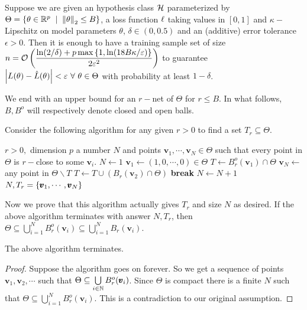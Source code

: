 \begin{cor}
Suppose we are given an hypothesis class ${\mathcal{H}}$ parameterized by $\Theta=\set{\theta \in\R^{p}\st \norm \theta2\le B}$, a loss function $\ell$ taking values in $[0,1]$ and $\kappa-$Lipschitz on model parameters $\theta$, $\delta\in(0,0.5)$ and an (additive) error tolerance $\epsilon>0$. Then it is enough to have a training sample set of size $\displaystyle n = {\mathcal{O}}\left(\frac{\ln(2/\delta) + p \max\left\{1,\ln(18B\kappa/\varepsilon)\right\}}{2\varepsilon^{2}}\right)$ to guarantee $\left| L(\theta)-\hat L(\theta) \right| < \varepsilon~\forall~ \theta\in \Theta$ with probability at least $1 - \delta$.
\end{cor}

\newpage 
We end with an upper bound for an $r-$net of $\Theta$ for $r\le B$. In what follows, $B,B^{o}$ will respectively denote closed and open balls. 

Consider the following algorithm for any given $r>0$ to find a set $T_{r}\subseteq \Theta$. 
\begin{algorithmic}[1]
\Require $r>0,$ dimension $p$
\Ensure a number $N$ and points $\pmb v_{1},\cdots,\pmb v_{N}\in \Theta$ such that every point in $\Theta$ is $r-$close to some $\pmb v_{i}$.
\Begin
\State $N\gets 1$
\State $\pmb v_{1} \gets (1,0,\cdots,0)\in\Theta$
\State $T \gets B_{r}^{o}(\pmb v_{1})\cap \Theta$ 
    \State $\pmb v_{N} \gets $any point in $\Theta\smallsetminus T$
    \State $T \gets T\cup (B_{r}(\pmb v_{2})\cap \Theta)$
     
    	\State \textbf{break}
	\Else
		\State $N \gets N+1$
	\EndIf
\EndWhile 
\State \Return $N,T_{r} = \left\{\pmb v_{1},\cdots,\pmb v_{N}\right\}$
\End
\end{algorithmic}

Now we prove that this algorithm actually gives $T_{r}$ and size $N$ as desired. 
If the above algorithm terminates with answer $N,T_{r}$, then $\Theta\subseteq \bigcup\limits_{i=1}^{N}B_{r}^{o}(\pmb v_{i}) \subseteq \bigcup\limits_{i=1}^{N}B_{r}(\pmb v_{i})$.

\begin{cl}
The above algorithm terminates.
\end{cl}
\begin{proof}
Suppose the algorithm goes on forever. So we get a sequence of points $\pmb v_{1}, \pmb v_{2},\cdots$ such that $\Theta \subseteq \bigcup\limits_{i\in\mathbb{N}}B_{r}^{o}(\pmb v_{i})$. Since $\Theta$ is compact there is a finite $N$ such that $\Theta\subseteq \bigcup\limits_{i=1}^{N}B_{r}^{o}(\pmb v_{i})$. This is a contradiction to our original assumption.
\end{proof}

